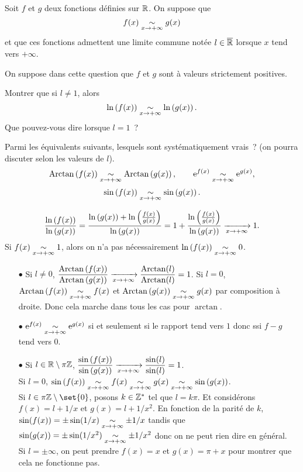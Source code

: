 \documentclass{magnolia}
\begin{document}


Soit $f$ et $g$ deux fonctions définies sur $\mathbb{R}$. On suppose que
\[f(x)\underset{x\rightarrow +\infty}{\sim}g(x)\]
et que ces fonctions admettent une limite commune notée $l\in\overline{\mathbb{R}}$ lorsque
$x$ tend vers $+\infty$.
\begin{questions}
\question On suppose dans cette question que $f$ et $g$ sont à valeurs
  strictement positives.
  \begin{questions}
  \question Montrer que si $l\neq 1$, alors
    \[\ln\left(f(x)\right)\underset{x\rightarrow +\infty}{\sim}\ln\left(g(x)\right).\]
  \question Que pouvez-vous dire lorsque $l=1$~?
  \end{questions}
\question Parmi les équivalents suivants, lesquels sont systématiquement vrais~?
  (on pourra discuter selon les valeurs de $l$).
  \[\operatorname{Arctan}\left(f(x)\right)\underset{x\rightarrow +\infty}{\sim}\operatorname{Arctan}\left(g(x)\right), \qquad 
    {\rm e}^{f(x)}\underset{x\rightarrow +\infty}{\sim} {\rm e}^{g(x)},\]
  \[\sin\left(f(x)\right)\underset{x\rightarrow +\infty}{\sim}\sin\left(g(x)\right).\]
  
\end{questions}

\begin{sol}
\begin{questions}
\question 
  \begin{questions}
  \question \[\frac{\ln\left(f(x)\right)}{\ln\left(g(x)\right)}=\frac{\ln\left(g(x)\right)+\ln\left(\frac{f(x)}{g(x)}\right)}{\ln\left(g(x)\right)}=1+\frac{\ln\left(\frac{f(x)}{g(x)}\right)}{\ln\left(g(x)\right)}\xrightarrow[x\rightarrow +\infty]{}{1}.\]
  \question Si $f(x)\underset{x\rightarrow +\infty}{\sim}1$, alors on n'a pas nécessairement $\ln\left(f(x)\right)\underset{x\rightarrow +\infty}{\sim}0$.
  \end{questions}
\question 
\begin{itemize}
\item [$\bullet$] Si $l\neq 0$, $\dfrac{\operatorname{Arctan}\left(f(x)\right)}{\operatorname{Arctan}\left(g(x)\right)}\xrightarrow[x\rightarrow +\infty]{}{\dfrac{\operatorname{Arctan}(l)}{\operatorname{Arctan}(l)}}=1$. Si $l=0$, $\operatorname{Arctan}\left(f(x)\right)\underset{x\rightarrow +\infty}{\sim}f(x)$ et $\operatorname{Arctan}\left(g(x)\right)\underset{x\rightarrow +\infty}{\sim}g(x)$ par composition à droite. Donc cela marche dans tous les cas pour $\arctan$.
\item [$\bullet$] 
${\rm e}^{f(x)}\underset{x\rightarrow +\infty}{\sim} {\rm e}^{g(x)}$ si et seulement si le rapport tend vers $1$ donc ssi $f-g$ tend vers $0$.
\item [$\bullet$] Si $l\in \mathbb{R}\setminus\pi\mathbb{Z}$, $\dfrac{\sin\left(f(x)\right)}{\sin\left(g(x)\right)}\xrightarrow[x\rightarrow +\infty]{}{\dfrac{\sin(l)}{\sin(l)}}=1$.\\
Si $l=0$, $\sin\left(f(x)\right)\underset{x\rightarrow +\infty}{\sim}f(x)\underset{x\rightarrow +\infty}{\sim}g(x)\underset{x\rightarrow +\infty}{\sim}\sin\left(g(x)\right)$.\\
Si $l\in \pi\Z\setminus{\set{0}}$, posons $k\in \mathbb{Z}^*$ tel que $l=k\pi$. Et considérons $f(x)=l+1/x$ et $g(x)=l+1/x^2$. En fonction de la parité de $k$, $\sin(f(x))=\pm\sin(1/x)\underset{x\rightarrow +\infty}{\sim}\pm 1/x$ tandis que $\sin(g(x))=\pm\sin(1/x^2)\underset{x\rightarrow +\infty}{\sim}\pm 1/x^2$ donc on ne peut rien dire en général.\\
Si $l=\pm \infty$, on peut prendre $f(x)=x$ et $g(x)=\pi+x$ pour montrer que cela ne fonctionne pas.
\end{itemize}
\end{questions}

\end{sol}
\end{document}
